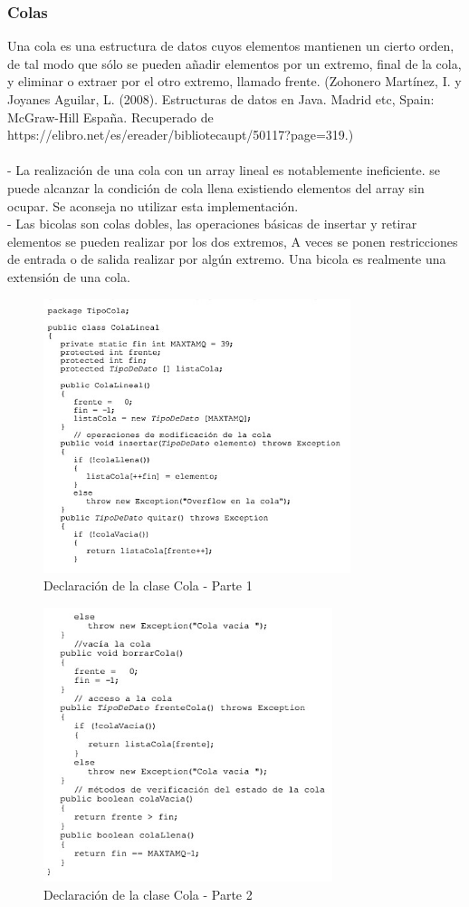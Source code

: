 \documentclass{article}
\begin{document}
\subsubsection{Colas}
Una cola es una estructura de datos cuyos elementos mantienen un cierto orden, de tal modo que sólo se pueden añadir elementos por un extremo, final de la cola, y eliminar o extraer por el otro extremo, llamado frente. (Zohonero Martínez, I. y Joyanes Aguilar, L. (2008). Estructuras de datos en Java. Madrid etc, Spain: McGraw-Hill España. Recuperado de https://elibro.net/es/ereader/bibliotecaupt/50117?page=319.)\\\\- La realización de una cola con un array lineal es notablemente ineficiente. se puede alcanzar la condición de cola llena existiendo elementos del array sin ocupar. Se aconseja no utilizar esta implementación.\\- Las bicolas son colas dobles, las operaciones básicas de insertar y retirar elementos se pueden realizar por los dos extremos, A veces se ponen restricciones de entrada o de salida realizar por algún extremo. Una bicola es realmente una extensión de una cola.
\begin{figure}[ht]
    \centering     
    \includegraphics[height=8cm]{images/figura5.jpg}
    \caption{Declaración de la clase Cola - Parte 1}
    \label{fig:BiasVoltager}
    
\end{figure}
\begin{figure}[ht]
    \centering     
    \includegraphics[height=8cm]{images/figura6.jpg}
    \caption{Declaración de la clase Cola - Parte 2}
    \label{fig:BiasVoltager}
    
\end{figure}
\end{document}
